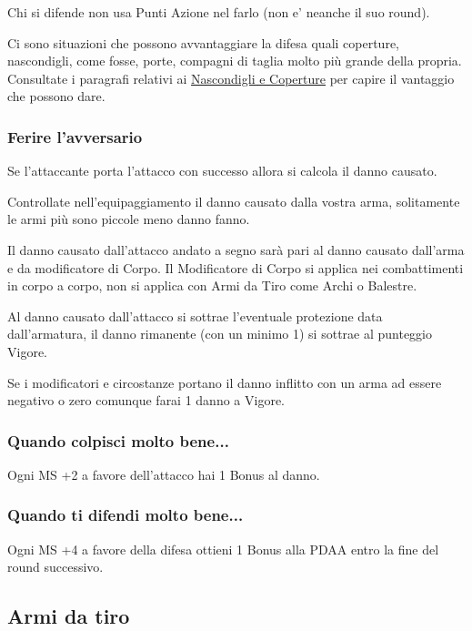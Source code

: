 \documentclass[12pt,a4paper,twoside,openany]{book}
\begin{document}
\begin{multicols}{2}
Chi si difende non usa Punti Azione nel farlo  (non e' neanche il suo round).

Ci sono situazioni che possono avvantaggiare la difesa quali coperture, nascondigli, come fosse, porte, compagni di taglia molto più grande della propria. Consultate i paragrafi relativi ai \hyperlink{coperture}{Nascondigli e Coperture} per capire il vantaggio che possono dare.

\subsubsection{Ferire l'avversario}

Se l'attaccante porta l'attacco con successo allora si calcola il danno causato.

Controllate nell'equipaggiamento il danno causato dalla vostra arma, solitamente le armi più sono piccole meno danno fanno.

Il danno causato dall'attacco andato a segno sarà pari al danno causato dall'arma e da modificatore di Corpo.
Il Modificatore di Corpo si applica nei combattimenti in corpo a corpo, non si applica con Armi da Tiro come Archi o Balestre.

Al danno causato dall'attacco si sottrae l'eventuale protezione data dall'armatura, il danno rimanente (con un minimo 1) si sottrae al punteggio Vigore.

Se i modificatori e circostanze portano il danno inflitto con un arma ad essere negativo o zero comunque farai 1 danno a Vigore.

\subsubsection{Quando colpisci molto bene...}

Ogni MS +2 a favore dell'attacco hai 1 Bonus al danno.

\subsubsection{Quando ti difendi molto bene...}

Ogni MS +4 a favore della difesa ottieni 1 Bonus alla PDAA entro la fine del round successivo.

\subsection{Armi da tiro}\label{armidatiro}


\end{multicols}
\end{document}
